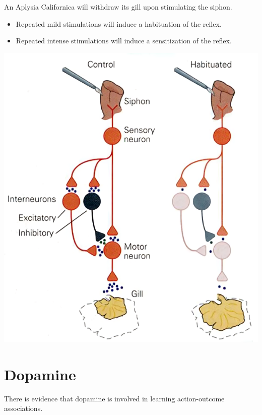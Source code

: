 \begin{minipage}{0.55\linewidth}
    \begin{example}
        An Aplysia Californica will withdraw its gill upon stimulating the siphon.
        \begin{itemize}
            \item Repeated mild stimulations will induce a habituation of the reflex.
            \item Repeated intense stimulations will induce a sensitization of the reflex.
        \end{itemize}
    \end{example}
\end{minipage}
\begin{minipage}{0.4\linewidth}
    \centering
    \includegraphics[width=0.9\linewidth]{./img/gill_habituation.png}
\end{minipage}



\section{Dopamine}

There is evidence that dopamine is involved in learning action-outcome associations.

